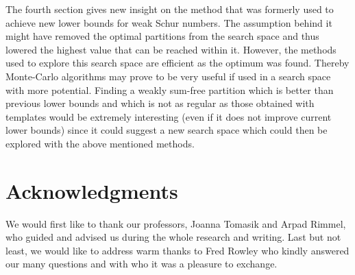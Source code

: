 \documentclass{article}
\newtheorem{computational theorem}[definition]{Computational Theorem}
\begin{document}
\par
The fourth section gives new insight on the method that was formerly used to achieve new lower bounds for weak 
Schur numbers. The assumption behind it might have removed the optimal partitions from the search space and thus 
lowered the highest value that can be reached within it. However, the methods used to explore this search space 
are efficient as the optimum was found. Thereby Monte-Carlo algorithms may prove to be very useful if used in a 
search space with more potential. Finding a weakly sum-free partition which is better than previous lower bounds 
and which is not as regular as those obtained with templates would be extremely interesting (even if it does not 
improve current lower bounds) since it could suggest a new search space which could then be explored with the 
above mentioned methods.


\section{Acknowledgments}

\qquad We would first like to thank our professors, Joanna Tomasik and Arpad Rimmel, who guided and advised
us during the whole research and writing. Last but not least, we would like to address warm thanks
to Fred Rowley who kindly answered our many questions and with who it was a pleasure to exchange.






\end{document}
